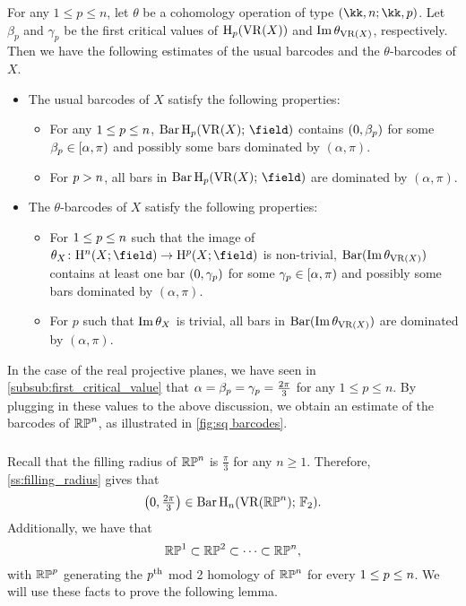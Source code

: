 For any $1 \leq p \leq n$, let $\theta$ be a cohomology operation of type $(\kk,n; \kk,\degp)$. 
Let $\beta_p$ and $\gamma_p$ be the first critical values of $\mathrm{H}_p(\operatorname{VR}(X))$ and $\operatorname{Im} \theta_{\operatorname{VR}(X)}$, respectively.
Then we have the following estimates of the usual barcodes and the $\theta$-barcodes of $X$. 
\begin{itemize}
    \item The usual barcodes of $X$ satisfy the following properties:
        \begin{itemize}
            \item For any $1 \leq p \leq n$, $\Hbarc[\field]{\degp}{X}$ contains $(0,\beta_p )$ for some $\beta_p \in [\alpha, \pi)$ and possibly some bars dominated by $(\alpha, \pi)$.
            \item For $p > n$, all bars in $\Hbarc[\field]{\degp}{X}$ are dominated by $(\alpha, \pi)$.
        \end{itemize}
    \item The $\theta$-barcodes of $X$ satisfy the following properties: 
        \begin{itemize}
            \item For $1 \leq p \leq n$ such that the image of $\theta_X \colon \rH^n(X; \field) \to \rH^p(X; \field)$ is non-trivial, $\operatorname{Bar}(\operatorname{Im} \theta_{\operatorname{VR}(X)})$ contains at least one bar $(0,\gamma_p )$ for some $\gamma_p \in [\alpha, \pi)$ and possibly some bars dominated by $(\alpha, \pi)$. 
            \item For $p$ such that $\operatorname{Im} \theta_X$ is trivial, all bars in $\operatorname{Bar}(\operatorname{Im} \theta_{\operatorname{VR}(X)})$ are dominated by $(\alpha, \pi)$. 
        \end{itemize}
\end{itemize}

\example 
In the case of the real projective planes, we have seen in \cref{subsub:first_critical_value} that $\alpha = \beta_p = \gamma_p = \tfrac{2\pi}{3}$ for any $1 \leq p \leq n$. 
By plugging in these values to the above discussion, we obtain an estimate of the barcodes of $\mathbb{RP}^n$, as illustrated in \cref{fig:sq barcodes}.

\subsubsection{}\label{prop:RPn bar}

Recall that the filling radius of $\mathbb{RP}^n$ is $\frac{\pi}{3}$ for any $n \geq 1$.
Therefore, \cref{ss:filling_radius} gives that
\[
\left(0, \tfrac{2\pi}{3}\right) \in \operatorname{Bar} \operatorname{H}_{n}(\operatorname{VR}(\mathbb{RP}^n);\,{\mathbb{F}_2}).
\]
Additionally, we have that
\[
\mathbb{RP}^1 \subset \mathbb{RP}^2 \subset \dots \subset \mathbb{RP}^n,
\]
with $\mathbb{RP}^p$ generating the $p^{\mathrm{th}}$ mod 2 homology of $\mathbb{RP}^n$ for every $1 \leq p \leq n$.
We will use these facts to prove the following lemma. 

